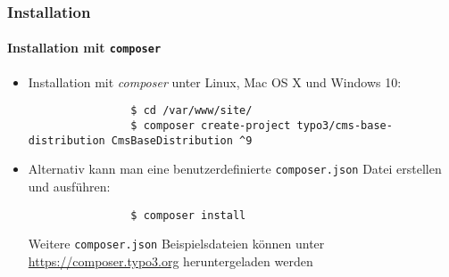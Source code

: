 \begin{frame}[fragile]
	\frametitle{Installation}
	\framesubtitle{Installation mit \texttt{composer}}

	\lstset{basicstyle=\tiny\ttfamily}

	\begin{itemize}
		\item Installation mit \textit{composer} unter Linux, Mac OS X und Windows 10:

			\begin{lstlisting}
				$ cd /var/www/site/
				$ composer create-project typo3/cms-base-distribution CmsBaseDistribution ^9
			\end{lstlisting}

		\item Alternativ kann man eine benutzerdefinierte \texttt{composer.json} Datei erstellen und ausführen:

			\begin{lstlisting}
				$ composer install
			\end{lstlisting}

			Weitere \texttt{composer.json} Beispielsdateien können unter \href{https://composer.typo3.org}{https://composer.typo3.org} heruntergeladen werden
			\normalsize

	\end{itemize}
\end{frame}

